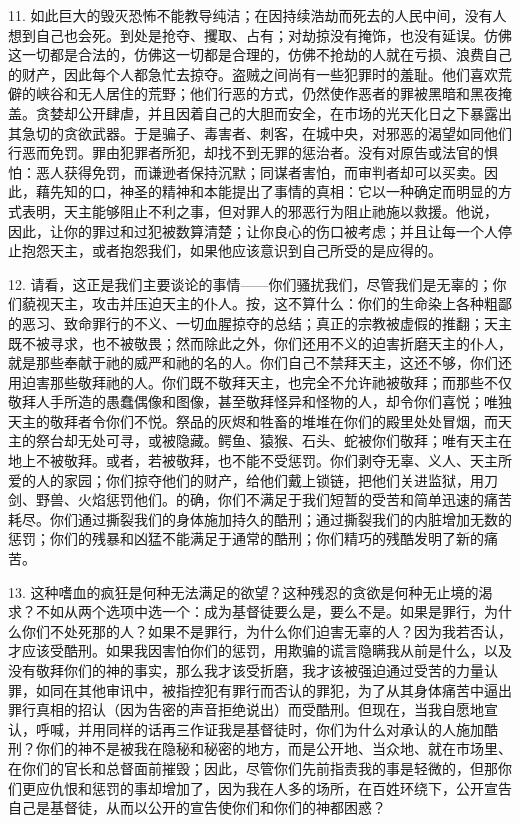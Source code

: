 11. 如此巨大的毁灭恐怖不能教导纯洁；在因持续浩劫而死去的人民中间，没有人想到自己也会死。到处是抢夺、攫取、占有；对劫掠没有掩饰，也没有延误。仿佛这一切都是合法的，仿佛这一切都是合理的，仿佛不抢劫的人就在亏损、浪费自己的财产，因此每个人都急忙去掠夺。盗贼之间尚有一些犯罪时的羞耻。他们喜欢荒僻的峡谷和无人居住的荒野；他们行恶的方式，仍然使作恶者的罪被黑暗和黑夜掩盖。贪婪却公开肆虐，并且因着自己的大胆而安全，在市场的光天化日之下暴露出其急切的贪欲武器。于是骗子、毒害者、刺客，在城中央，对邪恶的渴望如同他们行恶而免罚。罪由犯罪者所犯，却找不到无罪的惩治者。没有对原告或法官的惧怕：恶人获得免罚，而谦逊者保持沉默；同谋者害怕，而审判者却可以买卖。因此，藉先知的口，神圣的精神和本能提出了事情的真相：它以一种确定而明显的方式表明，天主能够阻止不利之事，但对罪人的邪恶行为阻止祂施以救援。他说， 因此，让你的罪过和过犯被数算清楚；让你良心的伤口被考虑；并且让每一个人停止抱怨天主，或者抱怨我们，如果他应该意识到自己所受的是应得的。\par

12. 请看，这正是我们主要谈论的事情——你们骚扰我们，尽管我们是无辜的；你们藐视天主，攻击并压迫天主的仆人。按，这不算什么：你们的生命染上各种粗鄙的恶习、致命罪行的不义、一切血腥掠夺的总结；真正的宗教被虚假的推翻；天主既不被寻求，也不被敬畏；然而除此之外，你们还用不义的迫害折磨天主的仆人，就是那些奉献于祂的威严和祂的名的人。你们自己不禁拜天主，这还不够，你们还用迫害那些敬拜祂的人。你们既不敬拜天主，也完全不允许祂被敬拜；而那些不仅敬拜人手所造的愚蠢偶像和图像，甚至敬拜怪异和怪物的人，却令你们喜悦；唯独天主的敬拜者令你们不悦。祭品的灰烬和牲畜的堆堆在你们的殿里处处冒烟，而天主的祭台却无处可寻，或被隐藏。鳄鱼、猿猴、石头、蛇被你们敬拜；唯有天主在地上不被敬拜。或者，若被敬拜，也不能不受惩罚。你们剥夺无辜、义人、天主所爱的人的家园；你们掠夺他们的财产，给他们戴上锁链，把他们关进监狱，用刀剑、野兽、火焰惩罚他们。的确，你们不满足于我们短暂的受苦和简单迅速的痛苦耗尽。你们通过撕裂我们的身体施加持久的酷刑；通过撕裂我们的内脏增加无数的惩罚；你们的残暴和凶猛不能满足于通常的酷刑；你们精巧的残酷发明了新的痛苦。\par

13. 这种嗜血的疯狂是何种无法满足的欲望？这种残忍的贪欲是何种无止境的渴求？不如从两个选项中选一个：成为基督徒要么是，要么不是。如果是罪行，为什么你们不处死那的人？如果不是罪行，为什么你们迫害无辜的人？因为我若否认，才应该受酷刑。如果我因害怕你们的惩罚，用欺骗的谎言隐瞒我从前是什么，以及没有敬拜你们的神的事实，那么我才该受折磨，我才该被强迫通过受苦的力量认罪，如同在其他审讯中，被指控犯有罪行而否认的罪犯，为了从其身体痛苦中逼出罪行真相的招认（因为告密的声音拒绝说出）而受酷刑。但现在，当我自愿地宣认，呼喊，并用同样的话再三作证我是基督徒时，你们为什么对承认的人施加酷刑？你们的神不是被我在隐秘和秘密的地方，而是公开地、当众地、就在市场里、在你们的官长和总督面前摧毁；因此，尽管你们先前指责我的事是轻微的，但那你们更应仇恨和惩罚的事却增加了，因为我在人多的场所，在百姓环绕下，公开宣告自己是基督徒，从而以公开的宣告使你们和你们的神都困惑？\par

